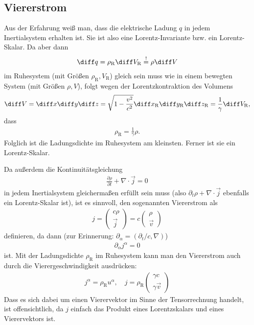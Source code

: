 \subsection{Viererstrom}

Aus der Erfahrung weiß man, dass die elektrische Ladung $q$ in jedem Inertialsystem erhalten ist.
Sie ist also eine Lorentz-Invariante bzw. ein Lorentz-Skalar. Da aber dann
\begin{align*}
    \diff q = \rho_\mathrm{R} \diff V_\mathrm{R} \overset!= \rho \diff V
\end{align*}
im Ruhesystem (mit Größen $\rho_\mathrm{R},V_\mathrm{R}$) gleich sein muss wie in einem bewegten System (mit Größen $\rho,V$),
folgt wegen der Lorentzkontraktion des Volumens
\begin{align*}
    \diff V = \diff x \diff y \diff z = \sqrt{1-\frac{v^2}{c^2}} \diff x_\mathrm{R} \diff y_\mathrm{R} \diff z_\mathrm{R} = \frac{1}{\gamma}\diff V_\mathrm{R},
\end{align*}
dass
\begin{align*}
    \boxed{\rho_\mathrm{R}=\frac{1}{\gamma}\rho.}
\end{align*}
Folglich ist die Ladungsdichte im Ruhesystem am kleinsten. Ferner ist sie ein Lorentz-Skalar.

Da außerdem die Kontinuitätsgleichung
\begin{align*}
    \frac{\partial\rho}{\partial t}+\nabla \cdot\vec j=0
\end{align*}
in jedem Inertialsystem gleichermaßen erfüllt sein muss (also $\partial_t \rho+\nabla\cdot\vec j$ ebenfalls ein Lorentz-Skalar ist),
ist es sinnvoll, den sogenannten Viererstrom als
\begin{align*}
    j=\begin{pmatrix} c\rho\\\vec j\end{pmatrix}=c\begin{pmatrix} \rho\\\vec v\end{pmatrix}
\end{align*}
definieren, da dann (zur Erinnerung: $\partial_\alpha=(\partial_t/c,\nabla)$)
\begin{align*}
    \partial_\alpha j^\alpha = 0
\end{align*}
ist. Mit der Ladungsdichte $\rho_\mathrm{R}$ im Ruhesystem kann man den Viererstrom auch durch die Vierergeschwindigkeit ausdrücken:
\begin{align*}
    j^\alpha=\rho_\mathrm{R} u^\alpha, \quad j=\rho_\mathrm{R} \begin{pmatrix} \gamma c\\\gamma\vec v\end{pmatrix}
\end{align*}
Dass es sich dabei um einen Vierervektor im Sinne der Tensorrechnung handelt, ist offensichtlich, da $j$ einfach das Produkt eines Lorentzskalars und eines Vierervektors ist.



